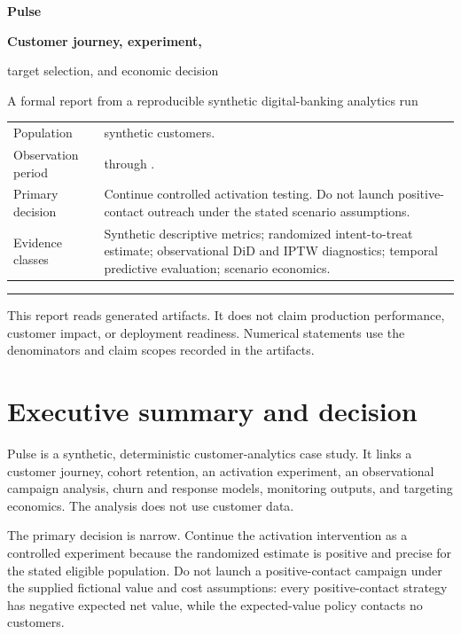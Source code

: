 \documentclass[10pt,a4paper]{article}
\begin{document}
\begin{titlepage}
\thispagestyle{empty}
\vspace*{13mm}
{\Large\bfseries Pulse}\par
\vspace{4mm}
{\huge\bfseries Customer journey, experiment,\par target selection, and economic decision}\par
\vspace{7mm}
{\large A formal report from a reproducible synthetic digital-banking analytics run}\par
\vspace{18mm}
\begin{tabularx}{\textwidth}{@{}L{35mm}Y@{}}
Population & \DatasetCustomers{} synthetic customers.\\
Observation period & \DatasetStart{} through \DatasetEnd{}.\\
Primary decision & Continue controlled activation testing. Do not launch positive-contact outreach under the stated scenario assumptions.\\
Evidence classes & Synthetic descriptive metrics; randomized intent-to-treat estimate; observational DiD and IPTW diagnostics; temporal predictive evaluation; scenario economics.\\
\end{tabularx}
\vfill
\rule{\textwidth}{0.4pt}\par
\vspace{3mm}
\small This report reads generated artifacts. It does not claim production performance, customer impact, or deployment readiness. Numerical statements use the denominators and claim scopes recorded in the artifacts.
\end{titlepage}

\tableofcontents
\clearpage

\section{Executive summary and decision}

Pulse is a synthetic, deterministic customer-analytics case study. It links a customer journey, cohort retention, an activation experiment, an observational campaign analysis, churn and response models, monitoring outputs, and targeting economics. The analysis does not use customer data.

The primary decision is narrow. Continue the activation intervention as a controlled experiment because the randomized estimate is positive and precise for the stated eligible population. Do not launch a positive-contact campaign under the supplied fictional value and cost assumptions: every positive-contact strategy has negative expected net value, while the expected-value policy contacts no customers.
\end{document}
